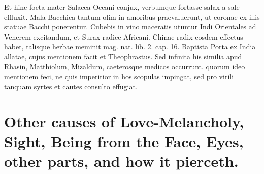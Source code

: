 {Et hinc foeta mater Salacea Oceani conjux, verbumque fortasse salax a
sale effluxit. Mala Bacchica tantum olim in amoribus praevaluerunt, ut
coronae ex illis statuae Bacchi ponerentur. Cubebis in vino
maceratis utuntur Indi Orientales ad Venerem excitandum, et Surax
radice Africani. Chinae radix eosdem effectus habet, talisque herbae
meminit mag. nat. lib. 2. cap. 16. Baptista Porta ex India
allatae, cujus mentionem facit et Theophrastus. Sed infinita his
similia apud Rhasin, Matthiolum, Mizaldum, caeterosque medicos
occurrunt, quorum ideo mentionem feci, ne quis imperitior in hos
scopulas impingat, sed pro virili tanquam syrtes et cautes consulto
effugiat.

\section[Other causes of Love-Melancholy]{Other causes of Love-Melancholy, Sight, Being from the Face, Eyes, other parts, and how it pierceth.}

}
